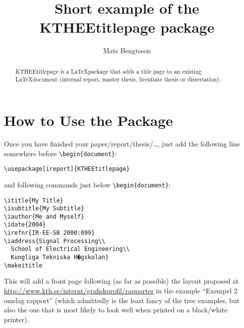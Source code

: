 \documentclass[a4paper]{article}
\begin{document}

\makeititle


\title{Short example of the KTHEEtitlepage package}
\author{Mats Bengtsson}

\maketitle

\begin{abstract}
  KTHEEtitlepage is a \LaTeX package that adds a title page to an
  existing \LaTeX document (internal report, master thesis, licentiate
  thesis or dissertation).
\end{abstract}

\section{How to Use the Package}
Once you have finished your paper/report/thesis/\dots, just add the 
following line somewhere before \verb+\begin{document}+:
\begin{verbatim}
\usepackage[ireport]{KTHEEtitlepage}
\end{verbatim}
and following commands just below \verb+\begin{document}+:
\begin{verbatim}
\ititle{My Title}
\isubtitle{My Subtitle}
\iauthor{Me and Myself}
\idate{2004}
\irefnr{IR-EE-SB 2000:099}
\iaddress{Signal Processing\\
  School of Electrical Engineering\\
  Kungliga Tekniska H�gskolan}
\makeititle
\end{verbatim}

This will add a front page following (as far as possible) the layout
proposed at \url{http://www.kth.se/internt/grafiskprofil/rapporter} in
the example ``Exempel 2 omslag rapport'' (which admittedly is the
least fancy of the tree examples, but also the one that is most likely
to look well when printed on a black/white printer). 
\end{document}
